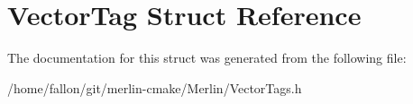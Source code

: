 \hypertarget{structVectorTag}{}\section{Vector\+Tag Struct Reference}
\label{structVectorTag}


The documentation for this struct was generated from the following file\+:\begin{DoxyCompactItemize}
\item 
/home/fallon/git/merlin-\/cmake/\+Merlin/Vector\+Tags.\+h\end{DoxyCompactItemize}
